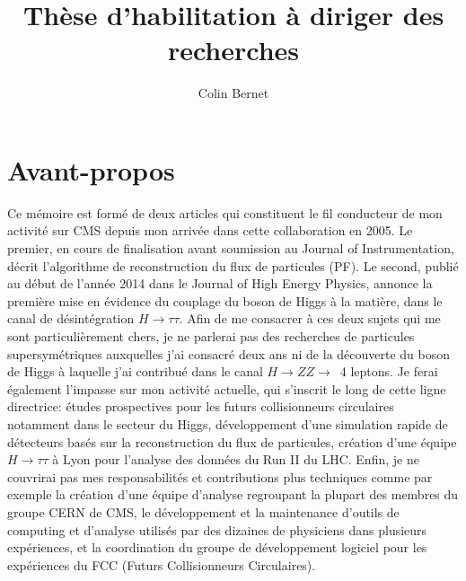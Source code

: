 \documentclass[11pt,twoside,a4paper,tdr]{cms-tdr}
\begin{document}
\title{Thèse d'habilitation à diriger des recherches}
\author{Colin Bernet}

\maketitle 

\section*{Avant-propos}

Ce mémoire est formé de deux articles qui constituent le fil conducteur de mon activité sur CMS depuis mon arrivée dans cette collaboration en 2005. 
Le premier, en cours de finalisation avant soumission au Journal of Instrumentation, décrit l'algorithme de reconstruction du flux de particules (PF).
Le second, publié au début de l'année 2014 dans le Journal of High Energy Physics, annonce la première mise en évidence du couplage du boson de Higgs à la matière, dans le canal de désintégration $H \rightarrow \tau \tau$. 
Afin de me consacrer à ces deux sujets qui me sont particulièrement chers, 
je ne parlerai pas des recherches de particules supersymétriques auxquelles j'ai consacré deux ans
ni de la découverte du boson de Higgs à laquelle j'ai contribué dans le canal $H \rightarrow ZZ \rightarrow$~4 leptons. 
Je ferai également l'impasse sur mon activité actuelle, qui s'inscrit le long de cette ligne directrice: études prospectives pour les futurs collisionneurs circulaires notamment dans le secteur du Higgs, développement d'une simulation rapide de détecteurs basés sur la reconstruction du flux de particules, création d'une équipe $H \rightarrow \tau \tau$ à Lyon pour l'analyse des données du Run II du LHC.
Enfin, je ne couvrirai pas mes responsabilités et contributions plus techniques comme par exemple la création d'une équipe d'analyse regroupant la plupart des membres du groupe CERN de CMS, le développement et la maintenance d'outils de computing et d'analyse utilisés par des dizaines de physiciens dans plusieurs expériences, et la coordination du groupe de développement logiciel pour les expériences du FCC (Futurs Collisionneurs Circulaires). 
\end{document}
